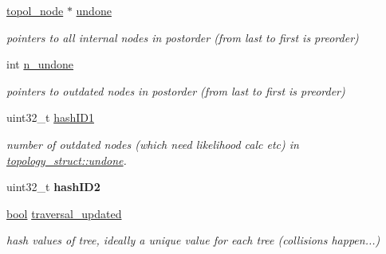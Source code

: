 \begin{DoxyCompactItemize}
\mbox{\label{structtopology__struct_af2564b454d8c1c3a92f91d116a40cb9f}} 
\hyperlink{structtopol__node__struct}{topol\+\_\+node} $\ast$ \hyperlink{structtopology__struct_af2564b454d8c1c3a92f91d116a40cb9f}{undone}
\begin{DoxyCompactList}\small\item\em pointers to all internal nodes in postorder (from last to first is preorder) \end{DoxyCompactList}\item 
\mbox{\label{structtopology__struct_a9b8d78548796d309bedaccabce5ef3e2}} 
int \hyperlink{structtopology__struct_a9b8d78548796d309bedaccabce5ef3e2}{n\+\_\+undone}
\begin{DoxyCompactList}\small\item\em pointers to outdated nodes in postorder (from last to first is preorder) \end{DoxyCompactList}\item 
\mbox{\label{structtopology__struct_a3755c32316ecb1418cd5403ac49bfc8a}} 
uint32\+\_\+t \hyperlink{structtopology__struct_a3755c32316ecb1418cd5403ac49bfc8a}{hash\+I\+D1}
\begin{DoxyCompactList}\small\item\em number of outdated nodes (which need likelihood calc etc) in \hyperlink{structtopology__struct_af2564b454d8c1c3a92f91d116a40cb9f}{topology\+\_\+struct\+::undone}. \end{DoxyCompactList}\item 
\mbox{\label{structtopology__struct_a075093f506de0dbe33c4f4385d429d46}} 
uint32\+\_\+t {\bfseries hash\+I\+D2}
\item 
\mbox{\label{structtopology__struct_ac0951ef0fe8bb99631fef979d11c93c7}} 
\hyperlink{lowlevel_8h_a97a80ca1602ebf2303258971a2c938e2}{bool} \hyperlink{structtopology__struct_ac0951ef0fe8bb99631fef979d11c93c7}{traversal\+\_\+updated}
\begin{DoxyCompactList}\small\item\em hash values of tree, ideally a unique value for each tree (collisions happen...) \end{DoxyCompactList}\item 
\mbox{\label{structtopology__struct_af34229c1a7f6312c4ca98c05b12aacc2}} 

\end{DoxyCompactItemize}
